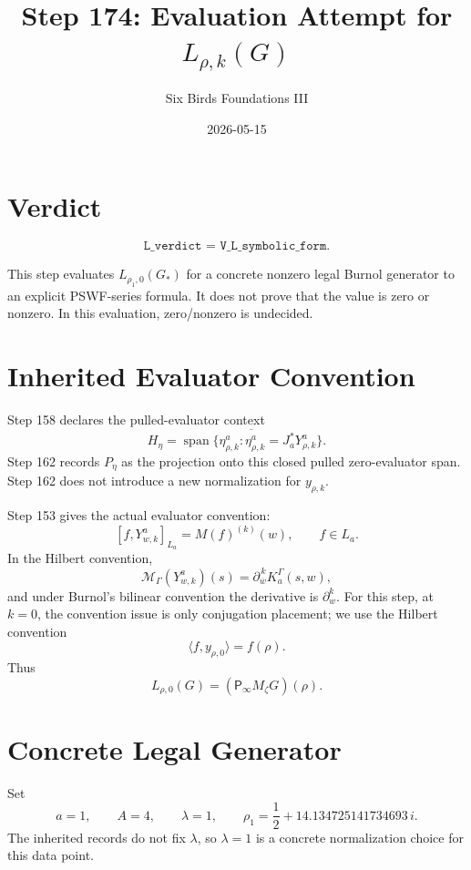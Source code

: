 \documentclass[11pt]{article}
\title{Step 174: Evaluation Attempt for \(L_{\rho,k}(G)\)}
\author{Six Birds Foundations III}
\date{2026-05-15}
\newcommand{\Psym}{\mathsf P_\infty}
\newcommand{\Mz}{M_\zeta}
\begin{document}
\maketitle

\section{Verdict}

\[
\boxed{\texttt{L\_verdict = V\_L\_symbolic\_form}.}
\]

This step evaluates \(L_{\rho_1,0}(G_*)\) for a concrete nonzero legal Burnol
generator to an explicit PSWF-series formula.  It does not prove that the value
is zero or nonzero.  In this evaluation, zero/nonzero is undecided.

\section{Inherited Evaluator Convention}

Step 158 declares the pulled-evaluator context
\[
H_\eta=\overline{\operatorname{span}\{\eta^a_{\rho,k}:
\eta^a_{\rho,k}=J_a^*Y^a_{\rho,k}\}}.
\]
Step 162 records \(P_\eta\) as the projection onto this closed pulled
zero-evaluator span.  Step 162 does not introduce a new normalization for
\(y_{\rho,k}\).

Step 153 gives the actual evaluator convention:
\[
[f,Y^a_{w,k}]_{L_a}=M(f)^{(k)}(w),
\qquad f\in L_a.
\]
In the Hilbert convention,
\[
\mathcal M_\Gamma(Y^a_{w,k})(s)
=\partial_{\overline w}^{\,k}K_a^\Gamma(s,w),
\]
and under Burnol's bilinear convention the derivative is \(\partial_w^k\).
For this step, at \(k=0\), the convention issue is only conjugation placement;
we use the Hilbert convention
\[
\langle f,y_{\rho,0}\rangle=f(\rho).
\]
Thus
\[
L_{\rho,0}(G)=(\Psym\Mz G)(\rho).
\]

\section{Concrete Legal Generator}

Set
\[
a=1,\qquad A=4,\qquad \lambda=1,
\qquad
\rho_1=\frac12+14.134725141734693\,i.
\]
The inherited records do not fix \(\lambda\), so \(\lambda=1\) is a concrete
normalization choice for this data point.
\end{document}
